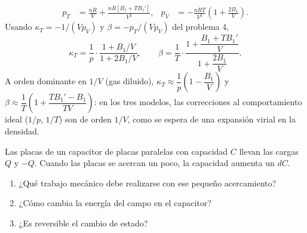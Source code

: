 \documentclass[12pt,a4paper]{article}
\newcommand{\paren}[1]{\left( #1 \right)}
\begin{document}
\begin{solucion}
\begin{enumerate}
\begin{align*}
                p_{T}&=\frac{nR}{V}+\frac{nR\left[B_{1}+TB_{1}'\right]}{V^{2}}, &
                p_{V}&=-\frac{nRT}{V^{2}}\left(1+\frac{2B_{1}}{V}\right).
            \end{align*}
            Usando $\kappa_{T}=-1/(Vp_{V})$ y $\beta=-p_{T}/(Vp_{V})$ del problema 4,
            \begin{equation*}
                \boxed{\kappa_{T}=\frac1p\cdot\frac{1+B_{1}/V}{1+2B_{1}/V},}\qquad
                \boxed{\beta=\frac1T\cdot\frac{1+\dfrac{B_{1}+TB_{1}'}{V}}{1+\dfrac{2B_{1}}{V}}.}
            \end{equation*}
            A orden dominante en $1/V$ (gas diluido), $\kappa_{T}\approx\dfrac1p\paren{1-\dfrac{B_{1}}{V}}$
            y $\beta\approx\dfrac1T\paren{1+\dfrac{TB_{1}'-B_{1}}{TV}}$: en los tres modelos, las
            correcciones al comportamiento ideal ($1/p$, $1/T$) son de orden $1/V$, como se
            espera de una expansión virial en la densidad.
        \end{enumerate}
    \end{solucion}

    \begin{problema}[Un capacitor]
        Las placas de un capacitor de placas paralelas con capacidad $C$ llevan las cargas $Q$
        y $-Q$. Cuando las placas se acercan un poco, la capacidad aumenta un $dC$.
        \begin{enumerate}
            \item[a)] ¿Qué trabajo mecánico debe realizarse con ese pequeño acercamiento?
            \item[b)] ¿Cómo cambia la energía del campo en el capacitor?
            \item[c)] ¿Es reversible el cambio de estado?
        \end{enumerate}
    \end{problema}
\end{document}
